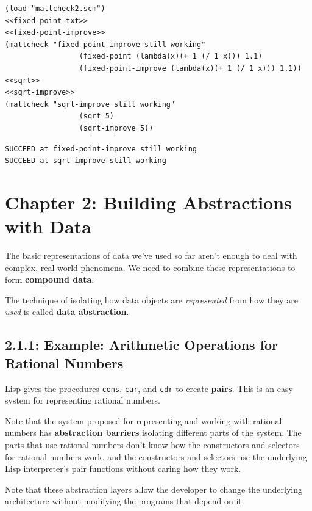 \documentclass[final,fleqn,titlepage,twoside]{article}
\begin{document}
\begin{verbatim}
(load "mattcheck2.scm")
<<fixed-point-txt>>
<<fixed-point-improve>>
(mattcheck "fixed-point-improve still working"
                 (fixed-point (lambda(x)(+ 1 (/ 1 x))) 1.1)
                 (fixed-point-improve (lambda(x)(+ 1 (/ 1 x))) 1.1))
<<sqrt>>
<<sqrt-improve>>
(mattcheck "sqrt-improve still working"
                 (sqrt 5)
                 (sqrt-improve 5))
\end{verbatim}

\begin{verbatim}
SUCCEED at fixed-point-improve still working
SUCCEED at sqrt-improve still working
\end{verbatim}

\section{Chapter 2: Building Abstractions with Data}
\label{sec:org287e36a}
The basic representations of data we've used so far aren't enough to deal with
complex, real-world phenomena. We need to combine these representations to form
\textbf{compound data}.

The technique of isolating how data objects are \emph{represented} from how they are
\emph{used} is called \textbf{data abstraction}.

\subsection{2.1.1: Example: Arithmetic Operations for Rational Numbers}
\label{sec:orge5f5d58}
Lisp gives the procedures \texttt{cons}, \texttt{car}, and \texttt{cdr}
to create \textbf{pairs}. This is an easy system for representing rational numbers.

Note that the system proposed for representing and working with rational numbers
has \textbf{abstraction barriers} isolating different parts of the system. The parts
that use rational numbers don't know how the constructors and selectors for
rational numbers work, and the constructors and selectors use the underlying
Lisp interpreter's pair functions without caring how they work.

Note that these abstraction layers allow the developer to change the underlying
architecture without modifying the programs that depend on it.
\end{document}
